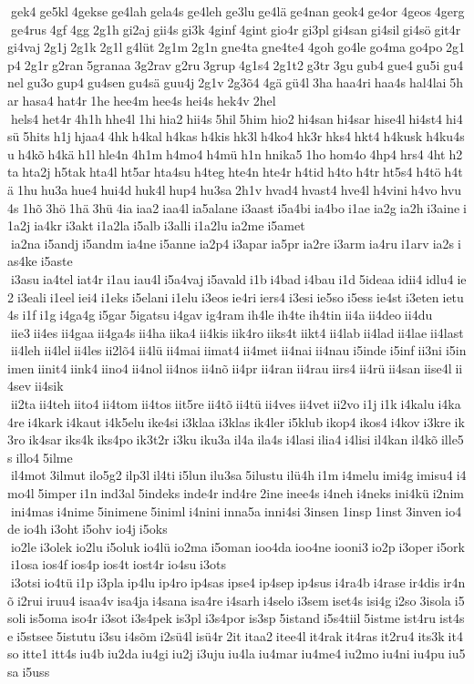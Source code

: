  gek4 ge5kl 4gekse ge4lah gela4s ge4leh ge3lu ge4lä ge4nan geok4 ge4or 4geos 4gerg ge4rus 4gf 4gg 2g1h gi2aj gii4s gi3k 4ginf 4gint gio4r gi3pl gi4san gi4sil gi4sö git4r gi4vaj 2g1j 2g1k 2g1l g4lüt 2g1m 2g1n gne4ta gne4te4 4goh go4le go4ma go4po 2g1p4 2g1r g2ran 5granaa 3g2rav g2ru 3grup 4g1s4 2g1t2 g3tr 3gu gub4 gue4 gu5i gu4nel gu3o gup4 gu4sen gu4sä guu4j 2g1v 2g3õ4 4gä gü4l 3ha haa4ri haa4s hal4lai 5har hasa4 hat4r 1he hee4m hee4s hei4s hek4v 2hel  hels4 het4r 4h1h hhe4l 1hi hia2 hii4s 5hil 5him hio2 hi4san hi4sar hise4l hi4st4 hi4sü 5hits h1j hjaa4 4hk h4kal h4kas h4kis hk3l h4ko4 hk3r hks4 hkt4 h4kusk h4ku4su h4kõ h4kä h1l hle4n 4h1m h4mo4 h4mü h1n hnika5 1ho hom4o 4hp4 hrs4 4ht h2ta hta2j h5tak hta4l ht5ar hta4su h4teg hte4n hte4r h4tid h4to h4tr ht5s4 h4tö h4tä 1hu hu3a hue4 hui4d huk4l hup4 hu3sa 2h1v hvad4 hvast4 hve4l h4vini h4vo hvu4s 1hõ 3hö 1hä 3hü 4ia iaa2 iaa4l ia5alane i3aast i5a4bi ia4bo i1ae ia2g ia2h i3aine i1a2j ia4kr i3akt i1a2la i5alb i3alli i1a2lu ia2me i5amet  ia2na i5andj i5andm ia4ne i5anne ia2p4 i3apar ia5pr ia2re i3arm ia4ru i1arv ia2s ias4ke i5aste  i3asu ia4tel iat4r i1au iau4l i5a4vaj i5avald i1b i4bad i4bau i1d 5ideaa idii4 idlu4 ie2 i3eali i1eel iei4 i1eks i5elani i1elu i3eos ie4ri iers4 i3esi ie5so i5ess ie4st i3eten ietu4s i1f i1g i4ga4g i5gar 5igatsu i4gav ig4ram ih4le ih4te ih4tin ii4a ii4deo ii4du  iie3 ii4es ii4gaa ii4ga4s ii4ha iika4 ii4kis iik4ro iiks4t iikt4 ii4lab ii4lad ii4lae ii4last ii4leh ii4lel ii4les ii2lõ4 ii4lü ii4mai iimat4 ii4met ii4nai ii4nau i5inde i5inf ii3ni i5inimen iinit4 iink4 iino4 ii4nol ii4nos ii4nõ ii4pr ii4ran ii4rau iirs4 ii4rü ii4san iise4l ii4sev ii4sik  ii2ta ii4teh iito4 ii4tom ii4tos iit5re ii4tõ ii4tü ii4ves ii4vet ii2vo i1j i1k i4kalu i4ka4re i4kark i4kaut i4k5elu ike4si i3klaa i3klas ik4ler i5klub ikop4 ikos4 i4kov i3kre ik3ro ik4sar iks4k iks4po ik3t2r i3ku iku3a il4a ila4s i4lasi ilia4 i4lisi il4kan il4kõ ille5s illo4 5ilme  il4mot 3ilmut ilo5g2 ilp3l il4ti i5lun ilu3sa 5ilustu ilü4h i1m i4melu imi4g imisu4 i4mo4l 5imper i1n ind3al 5indeks inde4r ind4re 2ine inee4s i4neh i4neks ini4kü i2nim ini4mas i4nime 5inimene 5iniml i4nini inna5a inni4si 3insen 1insp 1inst 3inven io4de io4h i3oht i5ohv io4j i5oks  io2le i3olek io2lu i5oluk io4lü io2ma i5oman ioo4da ioo4ne iooni3 io2p i3oper i5ork i1osa ios4f ios4p ios4t iost4r io4su i3ots  i3otsi io4tü i1p i3pla ip4lu ip4ro ip4sas ipse4 ip4sep ip4sus i4ra4b i4rase ir4dis ir4nõ i2rui iruu4 isaa4v isa4ja i4sana isa4re i4sarh i4selo i3sem iset4s isi4g i2so 3isola i5soli is5oma iso4r i3sot i3s4pek is3pl i3s4por is3sp 5istand i5s4tiil 5istme ist4ru ist4se i5stsee 5istutu i3su i4sõm i2sü4l isü4r 2it itaa2 itee4l it4rak it4ras it2ru4 its3k it4so itte1 itt4s iu4b iu2da iu4gi iu2j i3uju iu4la iu4mar iu4me4 iu2mo iu4ni iu4pu iu5sa i5uss 
